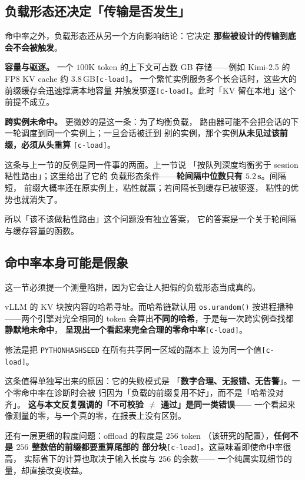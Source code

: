 \subsection{负载形态还决定「传输是否发生」}

命中率之外，负载形态还从另一个方向影响结论：它决定
\textbf{那些被设计的传输到底会不会被触发}。

\noindent\textbf{容量与驱逐。} 一个 $100$K token 的上下文可占数 GB
存储——例如 Kimi-2.5 的 FP8 KV cache 约 $3.8$\,GB\texttt{[c-load]}。
一个繁忙实例服务多个长会话时，这些大的前缀缓存会迅速撑满本地容量
并触发驱逐\texttt{[c-load]}。此时「KV 留在本地」这个前提不成立。

\noindent\textbf{跨实例未命中。} 更微妙的是这一条：为了均衡负载，
路由器可能不会把会话的下一轮调度到同一个实例上；一旦会话被迁到
别的实例，那个实例\textbf{从未见过该前缀，必须从头重算}
\texttt{[c-load]}。

\noindent 这条与上一节的反例是同一件事的两面。上一节说
「按队列深度均衡劣于 session 粘性路由」；这里给出了它的
负载形态条件——\textbf{轮间隔中位数只有 $5.2$\,s}。间隔短，
前缀大概率还在原实例上，粘性就赢；若间隔长到缓存已被驱逐，
粘性的优势也就消失了。

\noindent 所以「该不该做粘性路由」这个问题没有独立答案，
它的答案是一个关于轮间隔与缓存容量的函数。

\subsection{命中率本身可能是假象}

这一节必须提一个测量陷阱，因为它会让人把假的负载形态当成真的。

\noindent vLLM 的 KV 块按内容的哈希寻址。而哈希链默认用
\texttt{os.urandom()} 按进程播种——两个引擎对完全相同的 token
会算出\textbf{不同的哈希}，于是每一次跨实例查找都\textbf{静默地未命中}，
\textbf{呈现出一个看起来完全合理的零命中率}\texttt{[c-load]}。

\noindent 修法是把 \texttt{PYTHONHASHSEED} 在所有共享同一区域的副本上
设为同一个值\texttt{[c-load]}。

\noindent 这条值得单独写出来的原因：它的失败模式是
「\textbf{数字合理、无报错、无告警}」。一个零命中率在诊断时会被
归因为「负载的前缀复用不好」，而不是「哈希没对齐」。
\textbf{这与本文反复强调的「不可校验 $\neq$ 通过」是同一类错误}——
一个看起来像测量的零，与一个真的零，在报表上没有区别。

\noindent 还有一层更细的粒度问题：offload 的粒度是 $256$ token
（该研究的配置），\textbf{任何不是 $256$ 整数倍的前缀都要重算尾部的
部分块}\texttt{[c-load]}。这意味着即使命中率很高，
实际省下的计算也取决于输入长度与 $256$ 的余数——
一个纯属实现细节的量，却直接改变收益。

